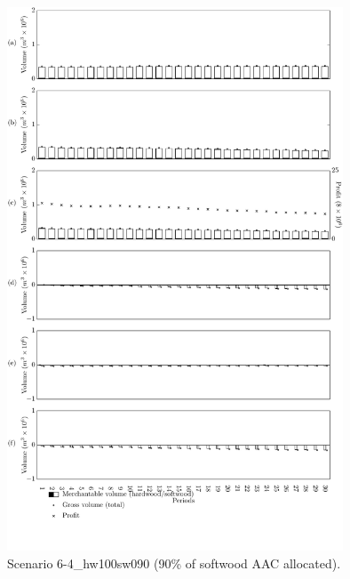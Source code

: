 \begin{figure}[h]
  \centering
  \includegraphics[width=10cm]{images/appendix/s6-4_hw100sw090}
  \caption{Scenario 6-4\_hw100sw090 (90\% of softwood AAC allocated).}
  \label{fig:s6-4_hw100sw090}
\end{figure}

